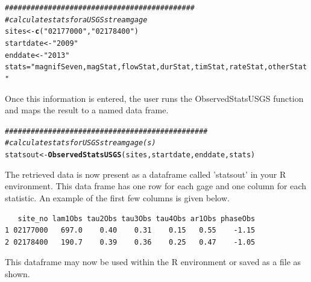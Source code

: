 \documentclass[a4paper,11pt]{article}\usepackage[]{graphicx}\usepackage[]{color}
\makeatletter
\newcommand{\hlstr}[1]{\textcolor[rgb]{0.192,0.494,0.8}{#1}}%
\newcommand{\hlcom}[1]{\textcolor[rgb]{0.678,0.584,0.686}{\textit{#1}}}%
\newcommand{\hlstd}[1]{\textcolor[rgb]{0.345,0.345,0.345}{#1}}%
\newcommand{\hlkwb}[1]{\textcolor[rgb]{0.69,0.353,0.396}{#1}}%
\newcommand{\hlkwd}[1]{\textcolor[rgb]{0.737,0.353,0.396}{\textbf{#1}}}%
\newenvironment{kframe}{%
 \def\at@end@of@kframe{}%
 \ifinner\ifhmode%
  \def\at@end@of@kframe{\end{minipage}}%
  \begin{minipage}{\columnwidth}%
 \fi\fi%
 \def\FrameCommand##1{\hskip\@totalleftmargin \hskip-\fboxsep
 \colorbox{shadecolor}{##1}\hskip-\fboxsep
     \hskip-\linewidth \hskip-\@totalleftmargin \hskip\columnwidth}%
 \MakeFramed {\advance\hsize-\width
   \@totalleftmargin\z@ \linewidth\hsize
   \@setminipage}}%
 {\par\unskip\endMakeFramed%
 \at@end@of@kframe}
\newenvironment{knitrout}{}{} %
\makeatother
\begin{document}
\begin{knitrout}
\color{fgcolor}\begin{kframe}
\begin{alltt}
\hlcom{############################################}
\hlcom{# calculate stats for a USGS streamgage}
\hlstd{sites} \hlkwb{<-} \hlkwd{c}\hlstd{(}\hlstr{"02177000"}\hlstd{,}\hlstr{"02178400"}\hlstd{)}
\hlstd{startdate} \hlkwb{<-} \hlstr{"2009"}
\hlstd{enddate} \hlkwb{<-} \hlstr{"2013"}
\hlstd{stats}\hlkwb{=}\hlstr{"magnifSeven,magStat,flowStat,durStat,timStat,rateStat,otherStat"}
\end{alltt}
\end{kframe}
\end{knitrout}

Once this information is entered, the user runs the ObservedStatsUSGS function and maps the result to a named data frame.



\begin{knitrout}
\color{fgcolor}\begin{kframe}
\begin{alltt}
\hlcom{###############################################}
\hlcom{# calculate stats for USGS streamgage(s)}
\hlstd{statsout} \hlkwb{<-} \hlkwd{ObservedStatsUSGS}\hlstd{(sites,startdate,enddate,stats)}
\end{alltt}
\end{kframe}
\end{knitrout}

The retrieved data is now present as a dataframe called 'statsout' in your R environment. This data frame has one row for each gage and one column for each statistic. An example of the first few columns is given below.

\begin{knitrout}
\color{fgcolor}\begin{kframe}
\begin{verbatim}
   site_no lam1Obs tau2Obs tau3Obs tau4Obs ar1Obs phaseObs
1 02177000   697.0    0.40    0.31    0.15   0.55    -1.15
2 02178400   190.7    0.39    0.36    0.25   0.47    -1.05
\end{verbatim}
\end{kframe}
\end{knitrout}

This dataframe may now be used within the R environment or saved as a file as shown.
\end{document}
